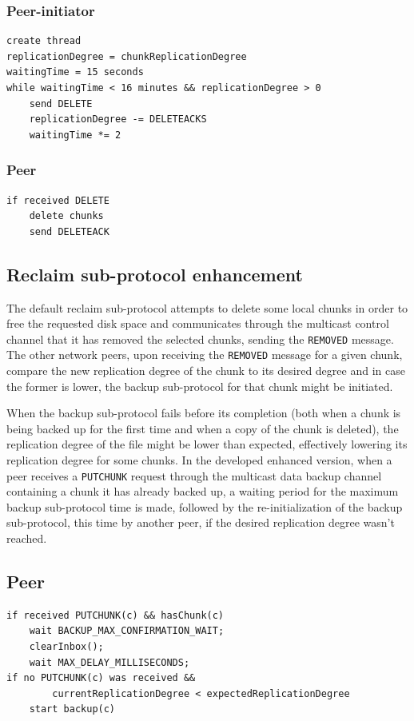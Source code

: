 \documentclass[a4paper,11pt]{article}
\begin{document}
\subsubsection*{Peer-initiator}
\begin{verbatim} 
create thread
replicationDegree = chunkReplicationDegree
waitingTime = 15 seconds
while waitingTime < 16 minutes && replicationDegree > 0
    send DELETE
    replicationDegree -= DELETEACKS
    waitingTime *= 2
\end{verbatim}

\subsubsection*{Peer}
\begin{verbatim} 
if received DELETE
    delete chunks
    send DELETEACK
\end{verbatim}

\subsection{Reclaim sub-protocol enhancement}
The default reclaim sub-protocol attempts to delete some local chunks in order to free the requested disk space and communicates through the multicast control channel that it has removed the selected chunks, sending the \texttt{REMOVED} message. The other network peers, upon receiving the \texttt{REMOVED} message for a given chunk, compare the new replication degree of the chunk to its desired degree and in case the former is lower, the backup sub-protocol for that chunk might be initiated.

When the backup sub-protocol fails before its completion (both when a chunk is being backed up for the first time and when a copy of the chunk is deleted), the replication degree of the file might be lower than expected, effectively lowering its replication degree for some chunks. In the developed enhanced version, when a peer receives a \texttt{PUTCHUNK} request through the multicast data backup channel containing a chunk it has already backed up, a waiting period for the maximum backup sub-protocol time is made, followed by the re-initialization of the backup sub-protocol, this time by another peer, if the desired replication degree wasn't reached.

\subsection*{Peer}
\begin{verbatim} 
if received PUTCHUNK(c) && hasChunk(c)
    wait BACKUP_MAX_CONFIRMATION_WAIT;
    clearInbox();
    wait MAX_DELAY_MILLISECONDS;
if no PUTCHUNK(c) was received &&
        currentReplicationDegree < expectedReplicationDegree
    start backup(c)
\end{verbatim}
\end{document}
